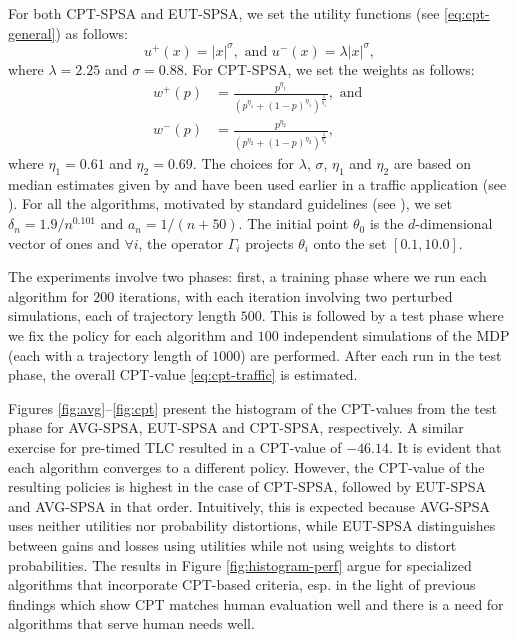For both CPT-SPSA and EUT-SPSA, we set the utility functions (see \eqref{eq:cpt-general}) as follows:
$$u^+(x) =  |x|^{\sigma}, \text{ and  }u^-(x) = \lambda |x|^{\sigma},$$ 
where $\lambda = 2.25$ and $\sigma = 0.88$.
For CPT-SPSA, we set the weights as follows:
\begin{align*}
w^+(p) &= \frac{p^{\eta_1}}{{(p^{\eta_1}+ (1-p)^{\eta_1})}^{\frac{1}{\eta_1}}}, \text{ and }\\  
w^-(p) &= \frac{p^{\eta_2}}{{(p^{\eta_2}+ (1-p)^{\eta_2})}^{\frac{1}{\eta_2}}},
\end{align*} 
where $\eta_1 = 0.61$ and $\eta_2 = 0.69$. The choices for $\lambda$, $\sigma$, $\eta_1$ and $\eta_2$ are based on median estimates given by \cite{tversky1992advances} and have been used earlier in a traffic application (see \cite{gao2010adaptive}).
For all the algorithms,
 motivated by standard guidelines (see \citealt{spall2005introduction}),
 we set $\delta_n = 1.9/n^{0.101}$ and $a_n = 1/(n+50)$. The initial point $\theta_0$ is the $d$-dimensional vector of ones and $\forall i$, the operator $\Gamma_i$ projects $\theta_i$ onto the set $[0.1, 10.0]$.
    
The experiments involve two phases:
first, a training phase where we run each algorithm for $200$ iterations, with each iteration involving two perturbed simulations, each of trajectory length $500$. This is followed by a test phase where we fix the policy for each algorithm and $100$ independent simulations of the MDP (each with a trajectory length of $1000$) are performed. After each run in the test phase, the overall CPT-value \eqref{eq:cpt-traffic} is estimated. 

Figures \ref{fig:avg}--\ref{fig:cpt} present the histogram of the CPT-values from the test phase for AVG-SPSA, EUT-SPSA and CPT-SPSA, respectively.  A similar exercise for pre-timed TLC resulted in a CPT-value of $-46.14$. It is evident that each algorithm converges to a different policy. However, the CPT-value of the resulting policies is highest in the case of CPT-SPSA, followed by EUT-SPSA and AVG-SPSA in that order. Intuitively, this is expected because AVG-SPSA uses neither utilities nor probability distortions, while EUT-SPSA distinguishes between gains and losses using utilities while not using weights to distort probabilities.
The results in Figure \ref{fig:histogram-perf} argue for specialized algorithms that incorporate CPT-based criteria, esp. in the light of previous findings which show CPT matches human evaluation well and there is a need for algorithms that serve human needs well.

